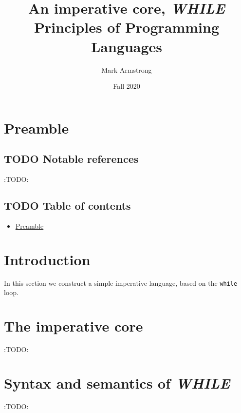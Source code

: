 \documentclass[11pt]{article}
\author{Mark Armstrong}
\date{Fall 2020}
\title{An imperative core, \emph{WHILE}\\\medskip
\large Principles of Programming Languages}
\theoremstyle{definition}
\begin{document}
\maketitle

\section{Preamble}
\label{sec:orgcbc6819}

\subsection{{\bfseries\sffamily TODO} Notable references}
\label{sec:orgfb184ba}

:TODO:

\subsection{{\bfseries\sffamily TODO} Table of contents}
\label{sec:orgfe35cf8}

\begin{scriptsize}
\begin{itemize}
\item \hyperref[sec:orgcbc6819]{Preamble}
\end{itemize}
\end{scriptsize}

\section{Introduction}
\label{sec:orgba4c6f4}

In this section we construct a simple imperative language,
based on the \texttt{while} loop.
\section{The imperative core}
\label{sec:org82cb56b}

:TODO:

\section{Syntax and semantics of \emph{WHILE}}
\label{sec:org7f96408}

:TODO:
\end{document}
